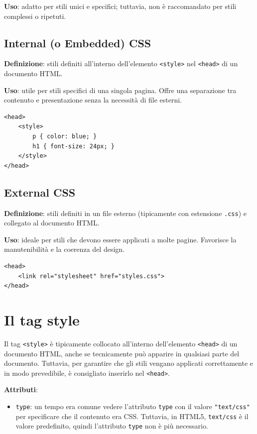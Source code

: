 \textbf{Uso}: adatto per stili unici e specifici; tuttavia, non è raccomandato per stili complessi o ripetuti.

\subsection{Internal (o Embedded) CSS}

\textbf{Definizione}: stili definiti all'interno dell'elemento \texttt{<style>} nel \texttt{<head>} di un documento HTML.

\textbf{Uso}: utile per stili specifici di una singola pagina. Offre una separazione tra contenuto e presentazione senza la necessità di file esterni.

\begin{lstlisting}[language=HTML5, caption=CSS interni]
<head>
    <style>
        p { color: blue; }
        h1 { font-size: 24px; }
    </style>
</head>
\end{lstlisting}

\subsection{External CSS}

\textbf{Definizione}: stili definiti in un file esterno (tipicamente con estensione \texttt{.css}) e collegato al documento HTML.

\textbf{Uso}: ideale per stili che devono essere applicati a molte pagine. Favorisce la manutenibilità e la coerenza del design.

\begin{lstlisting}[language=HTML5, caption=Collegamento a CSS esterno]
<head>
    <link rel="stylesheet" href="styles.css">
</head>
\end{lstlisting}

\section{Il tag style}

Il tag \texttt{<style>} è tipicamente collocato all'interno dell'elemento \texttt{<head>} di un documento HTML, anche se tecnicamente può apparire in qualsiasi parte del documento. Tuttavia, per garantire che gli stili vengano applicati correttamente e in modo prevedibile, è consigliato inserirlo nel \texttt{<head>}.

\textbf{Attributi}:
\begin{itemize}
    \item \texttt{type}: un tempo era comune vedere l'attributo \texttt{type} con il valore \texttt{"text/css"} per specificare che il contenuto era CSS. Tuttavia, in HTML5, \texttt{text/css} è il valore predefinito, quindi l'attributo \texttt{type} non è più necessario.
\end{itemize}


